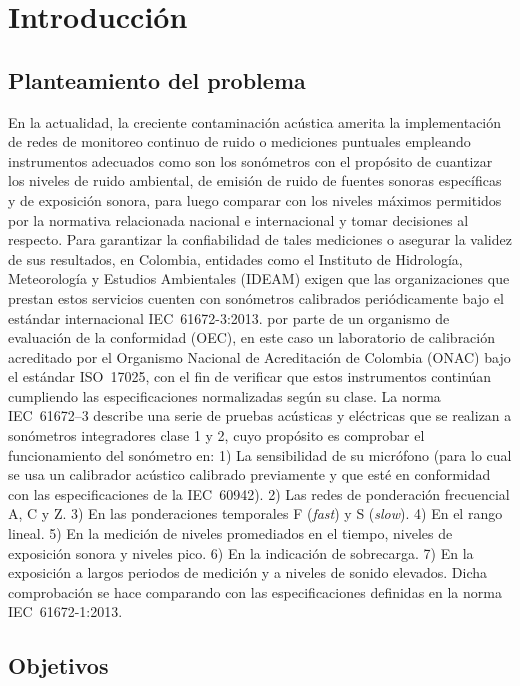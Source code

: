 \chapter{Introducción}

\section{Planteamiento del problema}
En la actualidad, la creciente contaminación acústica amerita la implementación de redes de monitoreo continuo de ruido o mediciones puntuales empleando instrumentos adecuados como son los sonómetros con el propósito de cuantizar los niveles de ruido ambiental, de emisión de ruido de fuentes sonoras específicas y de exposición sonora, para luego comparar con los niveles máximos permitidos por la normativa relacionada nacional e internacional y tomar decisiones al respecto.
Para garantizar la confiabilidad de tales mediciones o asegurar la validez de sus resultados, en Colombia, entidades como el Instituto de Hidrología, Meteorología y Estudios Ambientales (IDEAM) exigen que las organizaciones que prestan estos servicios cuenten con sonómetros calibrados periódicamente bajo el estándar internacional \mbox{IEC 61672-3:2013}.
por parte de un organismo de evaluación de la conformidad (OEC), en este caso un laboratorio de calibración acreditado por el Organismo Nacional de Acreditación de Colombia (ONAC) bajo el estándar \mbox{ISO 17025}, con el fin de verificar que estos instrumentos continúan cumpliendo las especificaciones normalizadas según su clase.
La norma \mbox{IEC 61672--3} describe una serie de pruebas acústicas y eléctricas que se realizan a sonómetros integradores clase 1 y 2, cuyo propósito es comprobar el funcionamiento del sonómetro en: 1) La sensibilidad de su micrófono (para lo cual se usa un calibrador acústico calibrado previamente y que esté en conformidad con las especificaciones de la \mbox{IEC 60942}).
2) Las redes de ponderación frecuencial A, C y Z. 3) En las ponderaciones temporales F (\emph{fast}) y S (\emph{slow}).
4) En el rango lineal.
5) En la medición de niveles promediados en el tiempo, niveles de exposición sonora y niveles pico.
6) En la indicación de sobrecarga.
7) En la exposición a largos periodos de medición y a niveles de sonido elevados.
Dicha comprobación se hace comparando con las especificaciones definidas en la norma \mbox{IEC 61672-1:2013}.

\section{Objetivos}

